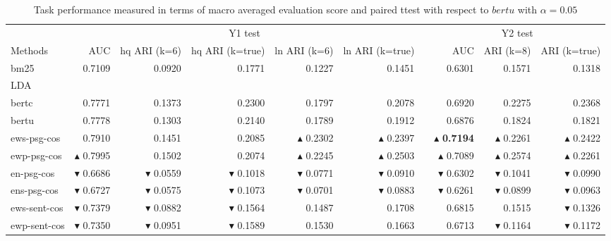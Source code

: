 \begin{table}[t]
\centering
\caption{Task performance measured in terms of macro averaged evaluation score and paired ttest with respect to $bertu$ with $\alpha = 0.05$}
\label{tab:by1}
\begin{tabular}{@{}lrrrrrrrrr@{}}\toprule
& \multicolumn{5}{c}{Y1 test} && \multicolumn{3}{c}{Y2 test}  \\
\cmidrule(r){2-6}
\cmidrule(r){8-10}
Methods & AUC & hq ARI (k=6) & hq ARI (k=true) & ln ARI (k=6) & ln ARI (k=true) && AUC & ARI (k=8) & ARI (k=true) \\\midrule
bm25 & 0.7109 & 0.0920 & 0.1771 & 0.1227 & 0.1451 && 0.6301 & 0.1571 & 0.1318 \\
LDA & & & & & && & & \\
bertc & 0.7771 & 0.1373 & 0.2300 & 0.1797 & 0.2078 && 0.6920 & 0.2275 & 0.2368 \\ 
bertu & 0.7778 & 0.1303 & 0.2140 & 0.1789 & 0.1912 && 0.6876 & 0.1824 & 0.1821 \\\midrule
ews-psg-cos & 0.7910 & 0.1451 & 0.2085 & $\blacktriangle$ 0.2302 & $\blacktriangle$ 0.2397 && $\blacktriangle$ \textbf{0.7194} & $\blacktriangle$ 0.2261 & $\blacktriangle$ 0.2422 \\ 
ewp-psg-cos & $\blacktriangle$ 0.7995 & 0.1502 & 0.2074 & $\blacktriangle$ 0.2245 & $\blacktriangle$ 0.2503 && $\blacktriangle$ 0.7089 & $\blacktriangle$ 0.2574 & $\blacktriangle$ 0.2261 \\ 
en-psg-cos & $\blacktriangledown$ 0.6686 & $\blacktriangledown$ 0.0559 & $\blacktriangledown$ 0.1018 & $\blacktriangledown$ 0.0771 & $\blacktriangledown$ 0.0910 && $\blacktriangledown$ 0.6302 & $\blacktriangledown$ 0.1041 & $\blacktriangledown$ 0.0990 \\ 
ens-psg-cos & $\blacktriangledown$ 0.6727 & $\blacktriangledown$ 0.0575 & $\blacktriangledown$ 0.1073 & $\blacktriangledown$ 0.0701 & $\blacktriangledown$ 0.0883 && $\blacktriangledown$ 0.6261 & $\blacktriangledown$ 0.0899 & $\blacktriangledown$ 0.0963 \\\midrule
ews-sent-cos & $\blacktriangledown$ 0.7379 & $\blacktriangledown$ 0.0882 & $\blacktriangledown$ 0.1564 & 0.1487 & 0.1708 && 0.6815 & 0.1515 & $\blacktriangledown$ 0.1326 \\ 
ewp-sent-cos & $\blacktriangledown$ 0.7350 & $\blacktriangledown$ 0.0951 & $\blacktriangledown$ 0.1589 & 0.1530 & 0.1663 && 0.6713 & $\blacktriangledown$ 0.1164 & $\blacktriangledown$ 0.1172 \\ 

\end{tabular}
\end{table}
